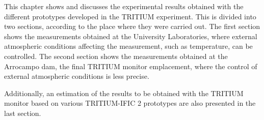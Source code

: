 This chapter shows and discusses the experimental results obtained with the different prototypes developed in the TRITIUM experiment. This is divided into two sections, according to the place where they were carried out. The first section shows the measurements obtained at the University Laboratories, where external atmospheric conditions affecting the measurement, such as temperature, can be controlled. The second section shows the measurements obtained at the Arrocampo dam, the final TRITIUM monitor emplacement, where the control of external atmospheric conditions is less precise.

Additionally, an estimation of the results to be obtained with the TRITIUM monitor based on various TRITIUM-IFIC 2 prototypes are also presented in the last section. 

